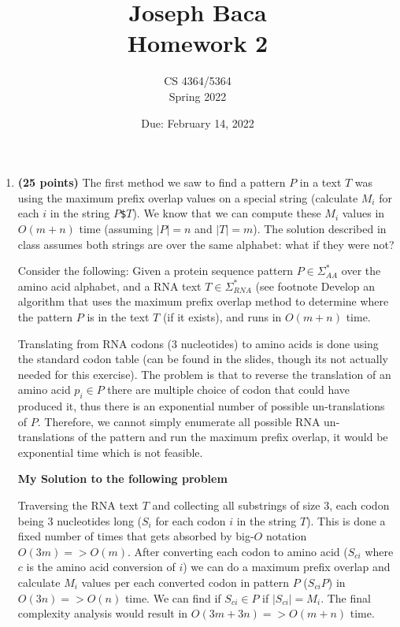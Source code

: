 \documentclass[11pt, oneside]{article}
\title{Joseph Baca \\ Homework 2}
\author{CS 4364/5364\\Spring 2022}
\date{Due: February 14, 2022}
\begin{document}
\maketitle

\begin{enumerate}


	\item \textbf{(25 points)}
	      The first method we saw to find a pattern $P$ in a text $T$ was using the maximum prefix overlap values on a special string (calculate $M_i$ for each $i$ in the string $P$\texttt{\$}$T$).
	      We know that we can compute these $M_i$ values in $O(m+n)$ time (assuming $|P|=n$ and $|T|=m$).
	      The solution described in class assumes both strings are over the same alphabet: what if they were not?

	      Consider the following:
	      Given a protein sequence pattern $P\in\Sigma_{AA}^*$ over the amino acid alphabet, and a RNA text $T\in\Sigma_{RNA}^*$
	      (see footnote
	      Develop an algorithm that uses the maximum prefix overlap method to determine where the pattern $P$ is in the text $T$ (if it exists),
	      and runs in $O(m+n)$ time.

	      Translating from RNA codons (3 nucleotides) to amino acids is done using the standard codon table (can be found in the slides, though its not actually needed for this exercise).
	      The problem is that to reverse the translation of an amino acid $p_i \in P$ there are multiple choice of codon that could have produced it,
	      thus there is an exponential number of possible un-translations of $P$.
	      Therefore, we cannot simply enumerate all possible RNA un-translations of the pattern and run the maximum prefix overlap, it would be exponential time which is not feasible.


	\begin{center}
		\textbf{My Solution to the following problem}
	\end{center}

	Traversing the RNA text $T$ and collecting all substrings of size 3, each codon being 3 nucleotides long ($S_{i}$ for each codon $i$ in the string $T$). This is done a fixed number of times that gets absorbed by big-$O$ notation $O(3m) => O(m)$. After converting each codon to amino acid ($S_{ci}$ where $c$ is the amino acid conversion of $i$) we can do a maximum prefix overlap and calculate $M_{i}$ values per each converted codon in pattern $P$ ($S_{ci}$\text{\$}$P$) in $O(3n) => O(n)$ time. We can find if $S_{ci} \in P$ if $|S_{ci}| = M_{i}$. The final complexity analysis would result in $O(3m+3n) => O(m+n)$ time.


\end{enumerate}
\end{document}
